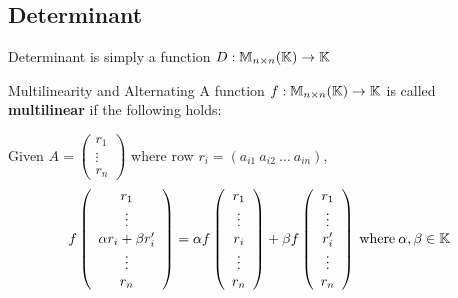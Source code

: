 \subsection{Determinant}

Determinant is simply a function \(D: \mathbb{M}_{n \times n}(\mathbb{K}) \to \mathbb{K}\)

\begin{definition} {Multilinearity and Alternating}
    A function \(f: \mathbb{M}_{n \times n}(\mathbb{K}) \to \mathbb{K}\) is called \textbf{multilinear} if the following holds:

    Given \(A = \left(\begin{array}{c}
    r_1 \\ \vdots \\ r_n
    \end{array}\right)\) where row \(r_i = (a_{i1} \: a_{i2} \: \ldots \: a_{in})\), \[
    f \left(\begin{array}{c}
    r_1 \\ \vdots \\ \alpha r_i + \beta r'_i \\ \vdots \\ r_n
    \end{array}\right) = \alpha f \left(\begin{array}{c}
    r_1 \\ \vdots \\ r_i \\ \vdots \\ r_n 
    \end{array}\right) + \beta f \left(\begin{array}{c}
    r_1 \\ \vdots \\ r'_i \\ \vdots \\ r_n
    \end{array}\right) \:\text{where}\: \alpha, \beta \in \mathbb{K}
    \]


\end{definition}
